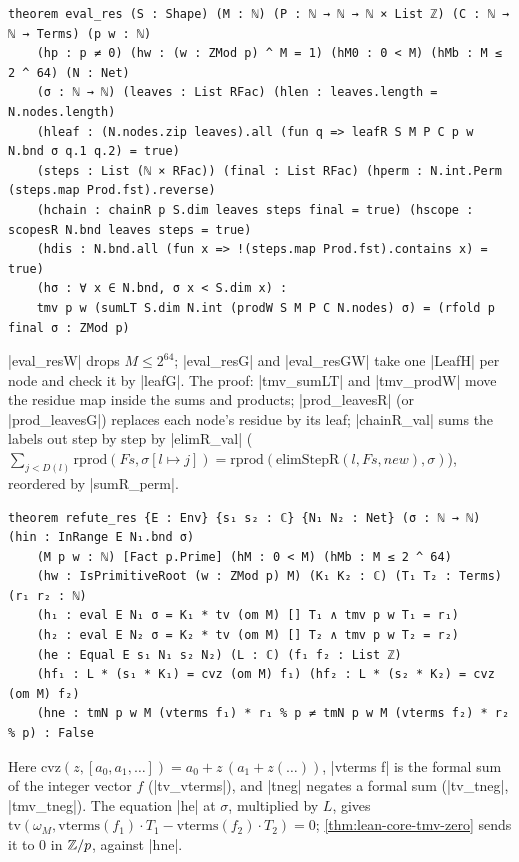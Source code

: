 \begin{theorem}\label{thm:lean-core-eval-res}
\begin{lstlisting}[style=lean]
theorem eval_res (S : Shape) (M : ℕ) (P : ℕ → ℕ → ℕ × List ℤ) (C : ℕ → ℕ → Terms) (p w : ℕ)
    (hp : p ≠ 0) (hw : (w : ZMod p) ^ M = 1) (hM0 : 0 < M) (hMb : M ≤ 2 ^ 64) (N : Net)
    (σ : ℕ → ℕ) (leaves : List RFac) (hlen : leaves.length = N.nodes.length)
    (hleaf : (N.nodes.zip leaves).all (fun q => leafR S M P C p w N.bnd σ q.1 q.2) = true)
    (steps : List (ℕ × RFac)) (final : List RFac) (hperm : N.int.Perm (steps.map Prod.fst).reverse)
    (hchain : chainR p S.dim leaves steps final = true) (hscope : scopesR N.bnd leaves steps = true)
    (hdis : N.bnd.all (fun x => !(steps.map Prod.fst).contains x) = true)
    (hσ : ∀ x ∈ N.bnd, σ x < S.dim x) :
    tmv p w (sumLT S.dim N.int (prodW S M P C N.nodes) σ) = (rfold p final σ : ZMod p)
\end{lstlisting}
\lean|eval_resW| drops $M\le 2^{64}$; \lean|eval_resG| and \lean|eval_resGW| take one \lean|LeafH| per node and check it by \lean|leafG|. The proof: \lean|tmv_sumLT| and \lean|tmv_prodW| move the residue map inside the sums and products; \lean|prod_leavesR| (or \lean|prod_leavesG|) replaces each node's residue by its leaf; \lean|chainR_val| sums the labels out step by step by \lean|elimR_val| ($\sum_{j<D(l)}\mathrm{rprod}(Fs,\sigma[l\mapsto j])=\mathrm{rprod}(\mathrm{elimStepR}(l,Fs,\mathit{new}),\sigma)$), reordered by \lean|sumR_perm|.
\end{theorem}

\begin{theorem}\label{thm:lean-core-refute-res}
\begin{lstlisting}[style=lean]
theorem refute_res {E : Env} {s₁ s₂ : ℂ} {N₁ N₂ : Net} (σ : ℕ → ℕ) (hin : InRange E N₁.bnd σ)
    (M p w : ℕ) [Fact p.Prime] (hM : 0 < M) (hMb : M ≤ 2 ^ 64)
    (hw : IsPrimitiveRoot (w : ZMod p) M) (K₁ K₂ : ℂ) (T₁ T₂ : Terms) (r₁ r₂ : ℕ)
    (h₁ : eval E N₁ σ = K₁ * tv (om M) [] T₁ ∧ tmv p w T₁ = r₁)
    (h₂ : eval E N₂ σ = K₂ * tv (om M) [] T₂ ∧ tmv p w T₂ = r₂)
    (he : Equal E s₁ N₁ s₂ N₂) (L : ℂ) (f₁ f₂ : List ℤ)
    (hf₁ : L * (s₁ * K₁) = cvz (om M) f₁) (hf₂ : L * (s₂ * K₂) = cvz (om M) f₂)
    (hne : tmN p w M (vterms f₁) * r₁ % p ≠ tmN p w M (vterms f₂) * r₂ % p) : False
\end{lstlisting}
\end{theorem}
\noindent Here $\mathrm{cvz}(z,[a_0,a_1,\ldots])=a_0+z\,(a_1+z(\ldots))$, \lean|vterms f| is the formal sum of the integer vector $f$ (\lean|tv_vterms|), and \lean|tneg| negates a formal sum (\lean|tv_tneg|, \lean|tmv_tneg|). The equation \lean|he| at $\sigma$, multiplied by $L$, gives $\mathrm{tv}(\omega_M,\mathrm{vterms}(f_1)\cdot T_1-\mathrm{vterms}(f_2)\cdot T_2)=0$; \cref{thm:lean-core-tmv-zero} sends it to $0$ in $\mathbb{Z}/p$, against \lean|hne|.

